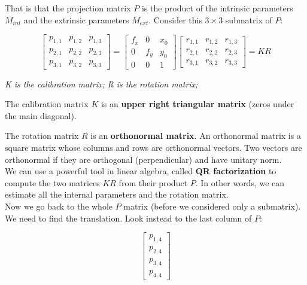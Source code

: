 \documentclass{article}
\begin{document}
That is that the projection matrix $P$ is the product of the intrinsic parameters $M_{int}$ and the extrinsic parameters $M_{ext}$. Consider this $3\times 3$ submatrix of $P$:

\begin{equation*}
    \begin{bmatrix}
        p_{1, 1} & p_{1, 2} & p_{1, 3} \\ 
        p_{2, 1} & p_{2, 2} & p_{2, 3} \\ 
        p_{3, 1} & p_{3, 2} & p_{3, 3}
    \end{bmatrix}
    =
    \begin{bmatrix}
        f_x & 0 & x_0 \\
        0 & f_y & y_0 \\
        0 & 0 & 1
    \end{bmatrix}
    \begin{bmatrix}
        r_{1, 1} & r_{1, 2} & r_{1, 3} \\
        r_{2, 1} & r_{2, 2} & r_{2, 3} \\
        r_{3, 1} & r_{3, 2} & r_{3, 3}
    \end{bmatrix}
    = KR
\end{equation*}

\begin{center}
    \textit{K is the calibration matrix;}
    \textit{R is the rotation matrix;}
\end{center}

The calibration matrix $K$ is an \textbf{upper right triangular matrix} (zeros under the main diagonal).

The rotation matrix $R$ is an \textbf{orthonormal matrix}. An orthonormal matrix is a square matrix whose columns and rows are orthonormal vectors. Two vectors are orthonormal if they are orthogonal (perpendicular) and have unitary norm. \\

We can use a powerful tool in linear algebra, called \textbf{QR factorization} to compute the two matrices $KR$ from their product $P$. In other words, we can estimate all the internal parameters and the rotation matrix. \\

Now we go back to the whole $P$ matrix (before we considered only a submatrix). We need to find the translation.  Look instead to the last column of $P$:

\begin{equation*}
    \begin{bmatrix}
        p_{1, 4} \\
        p_{2, 4} \\
        p_{3, 4} \\
        p_{4, 4}
    \end{bmatrix}
\end{equation*}
\end{document}
